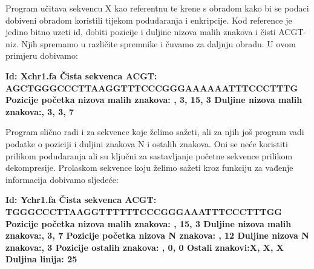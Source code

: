 Program učitava sekvencu X kao referentnu te krene s obradom kako bi se podaci dobiveni obradom koristili tijekom podudaranja i enkripcije. Kod reference je jedino bitno uzeti id, dobiti pozicije i duljine nizova malih znakova i čisti ACGT-niz. Njih spremamo u različite spremnike i čuvamo za daljnju obradu. U ovom primjeru dobivamo:\newline

\begin{minipage}{10cm}
	\textbf{Id: Xchr1.fa\newline
		Čista sekvenca ACGT:\newline
		AGCTGGGCCCTTAAGGTTTCCCGGGAAAAAATTTCCCTTTG\newline
		Pozicije početka nizova malih znakova: , 3, 15, 3 \newline
		Duljine nizova malih znakova:, 3, 3, 7\newline}
\end{minipage}

Program slično radi i za sekvence koje želimo sažeti, ali za njih još program vadi podatke o poziciji i duljini znakova N i ostalih znakova. Oni se neće koristiti prilikom podudaranja ali su ključni za sastavljanje početne sekvence prilikom dekompresije. Prolaskom sekvence koju želimo sažeti kroz funkciju za vađenje informacija dobivamo sljedeće: 

\begin{minipage}{10cm}
	\textbf{Id: Ychr1.fa\newline
		Čista sekvenca ACGT:\newline
		TGGGCCCTTAAGGTTTTTTCCCGGGAAATTTCCCTTTGG\newline
		Pozicije početka nizova malih znakova: , 15, 3 \newline
		Duljine nizova malih znakova:, 3, 7\newline
		Pozicije početka nizova N znakova: , 12\newline
		Duljine nizova N znakova:, 3\newline
		Pozicije ostalih znakova: , 0, 0 \newline
		Ostali znakovi:\newline X, X, X\newline
		Duljina linija: 25 \newline
	}
\end{minipage}


